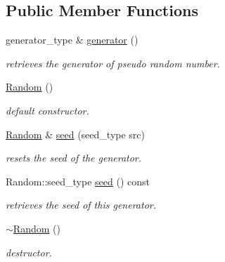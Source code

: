 \subsection*{Public Member Functions}
\begin{DoxyCompactItemize}
\item 
\hypertarget{classhryky_1_1testing_1_1_random_ad27c26b20876bd0275fe320b93c61515}{generator\-\_\-type \& \hyperlink{classhryky_1_1testing_1_1_random_ad27c26b20876bd0275fe320b93c61515}{generator} ()}\label{classhryky_1_1testing_1_1_random_ad27c26b20876bd0275fe320b93c61515}

\begin{DoxyCompactList}\small\item\em retrieves the generator of pseudo random number. \end{DoxyCompactList}\item 
\hyperlink{classhryky_1_1testing_1_1_random_aca50cb32f01d8a1adadd5b7aa958ed46}{Random} ()
\begin{DoxyCompactList}\small\item\em default constructor. \end{DoxyCompactList}\item 
\hypertarget{classhryky_1_1testing_1_1_random_ab4f5788fede6b6ab1241aa3b7fad0d66}{\hyperlink{classhryky_1_1testing_1_1_random}{Random} \& \hyperlink{classhryky_1_1testing_1_1_random_ab4f5788fede6b6ab1241aa3b7fad0d66}{seed} (seed\-\_\-type src)}\label{classhryky_1_1testing_1_1_random_ab4f5788fede6b6ab1241aa3b7fad0d66}

\begin{DoxyCompactList}\small\item\em resets the seed of the generator. \end{DoxyCompactList}\item 
\hypertarget{classhryky_1_1testing_1_1_random_a958cec1b0034ea77629b6e5e9c8ecddc}{Random\-::seed\-\_\-type \hyperlink{classhryky_1_1testing_1_1_random_a958cec1b0034ea77629b6e5e9c8ecddc}{seed} () const }\label{classhryky_1_1testing_1_1_random_a958cec1b0034ea77629b6e5e9c8ecddc}

\begin{DoxyCompactList}\small\item\em retrieves the seed of this generator. \end{DoxyCompactList}\item 
\hypertarget{classhryky_1_1testing_1_1_random_a2fca1ef5553e2c2151de6668c54ded5d}{\hyperlink{classhryky_1_1testing_1_1_random_a2fca1ef5553e2c2151de6668c54ded5d}{$\sim$\-Random} ()}\label{classhryky_1_1testing_1_1_random_a2fca1ef5553e2c2151de6668c54ded5d}

\begin{DoxyCompactList}\small\item\em destructor. \end{DoxyCompactList}\end{DoxyCompactItemize}


